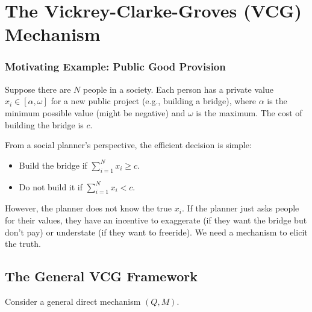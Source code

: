 \chapter{The Vickrey-Clarke-Groves (VCG) Mechanism}

\subsection*{Motivating Example: Public Good Provision}
Suppose there are $N$ people in a society. Each person has a private value $x_i \in [\alpha, \omega]$ for a new public project (e.g., building a bridge), where $\alpha$ is the minimum possible value (might be negative) and $\omega$ is the maximum. The cost of building the bridge is $c$. 

From a social planner's perspective, the efficient decision is simple:
\begin{itemize}
    \item Build the bridge if $\sum_{i=1}^N x_i \ge c$.
    \item Do not build it if $\sum_{i=1}^N x_i < c$.
\end{itemize}
However, the planner does not know the true $x_i$. If the planner just asks people for their values, they have an incentive to exaggerate (if they want the bridge but don't pay) or understate (if they want to freeride). We need a mechanism to elicit the truth.


\section{The General VCG Framework}
Consider a general direct mechanism $(Q, M)$. 



